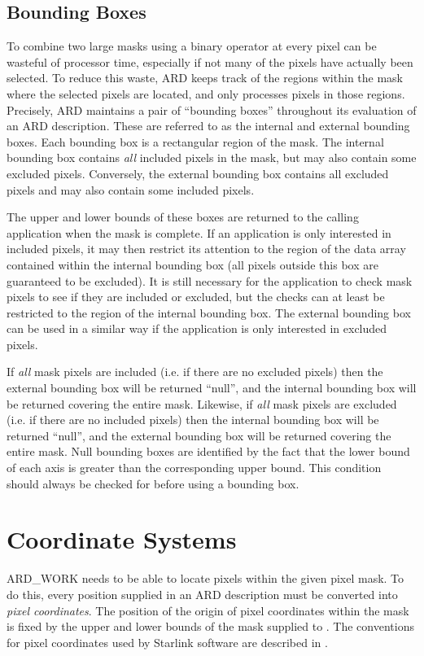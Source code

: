 \documentclass[11pt,nolof]{starlink}
\begin{document}
\subsection{\label{SEC:BBOX}Bounding Boxes}
To combine two large masks using a binary operator at every pixel can be
wasteful of processor time, especially if not many of the pixels have actually
been selected. To reduce this waste, ARD keeps track of the regions within the
mask where the selected pixels are located, and only processes pixels in those
regions. Precisely, ARD maintains a pair of ``bounding boxes'' throughout its
evaluation of an ARD description. These are referred to as the internal and
external bounding boxes. Each bounding box is a rectangular region of the mask.
The internal bounding box contains \emph{all} included pixels in the mask, but
may also contain some excluded pixels. Conversely, the external bounding box
contains all excluded pixels and may also contain some included pixels.

The upper and lower bounds of these boxes are returned to the calling
application when the mask is complete. If an application is only interested in
included pixels, it may then restrict its attention to the region of the data
array contained within the internal bounding box (all pixels outside this box
are guaranteed to be excluded). It is still necessary for the application to
check mask pixels to see if they are included or excluded, but the checks can
at least be restricted to the region of the internal bounding box. The external
bounding box can be used in a similar way if the application is only interested
in excluded pixels.

If \emph{all} mask pixels are included (i.e. if there are no excluded pixels)
then the external bounding box will be returned ``null'', and the internal
bounding box will be returned covering the entire mask. Likewise, if \emph{all}
mask pixels are excluded (i.e. if there are no included pixels) then the
internal bounding box will be returned ``null'', and the external bounding box
will be returned covering the entire mask. Null bounding boxes are identified by
the fact that the lower bound of each axis is greater than the corresponding
upper bound. This condition should always be checked for before using a
bounding box.

\section{\label{SEC:COORD}Coordinate Systems}
ARD\_WORK needs to be able to locate pixels within the given pixel mask.
To do this, every position supplied in an ARD description must be
converted into \emph{pixel coordinates}. The position of the origin of
pixel coordinates within the mask is fixed by the upper and lower bounds
of the mask supplied to . The conventions
for pixel coordinates used by Starlink software are described in
.
\end{document}
